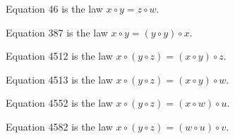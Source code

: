\begin{definition}[Equation 46]\label{eq46}\leanok{}  Equation 46 is the law $x \circ y = z \circ w$.
\end{definition}

\begin{definition}[Equation 387]\label{eq387}\leanok{}  Equation 387 is the law $x \circ y = (y \circ y) \circ x$.
\end{definition}

\begin{definition}[Equation 4512]\label{eq4512}\leanok{}  Equation 4512 is the law $x \circ (y \circ z) = (x \circ y) \circ z$.
\end{definition}

\begin{definition}[Equation 4513]\label{eq4513}\leanok{}  Equation 4513 is the law $x \circ (y \circ z) = (x \circ y) \circ w$.
\end{definition}

\begin{definition}[Equation 4552]\label{eq4552}\leanok{}  Equation 4552 is the law $x \circ (y \circ z) = (x \circ w) \circ u$.
\end{definition}

\begin{definition}[Equation 4582]\label{eq4582}\leanok{}  Equation 4582 is the law $x \circ (y \circ z) = (w \circ u) \circ v$.
\end{definition}
